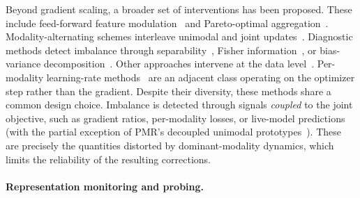 \documentclass{article} %
\begin{document}
Beyond gradient scaling, a broader set of interventions has been proposed. These include feed-forward feature modulation~\citep{wei2024opm} and Pareto-optimal aggregation~\citep{wei2024mmpareto}. Modality-alternating schemes interleave unimodal and joint updates~\citep{hua2024reconboost,zhang2024mla}. Diagnostic methods detect imbalance through separability~\citep{wei2024dr}, Fisher information~\citep{huang2025inforeg}, or bias-variance decomposition~\citep{wei2025improving}. Other approaches intervene at the data level~\citep{ma2025remixing,yu2026tcmax}. Per-modality learning-rate methods~\citep{yao2022mslr,guerra2025miles} are an adjacent class operating on the optimizer step rather than the gradient. Despite their diversity, these methods share a common design choice. Imbalance is detected through signals \emph{coupled} to the joint objective, such as gradient ratios, per-modality losses, or live-model predictions (with the partial exception of PMR's decoupled unimodal prototypes~\citep{fan2023pmr}). These are precisely the quantities distorted by dominant-modality dynamics, which limits the reliability of the resulting corrections.


\paragraph{Representation monitoring and probing.}
\end{document}
